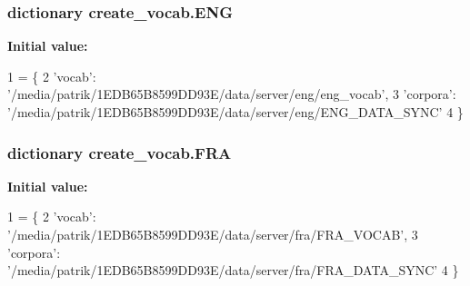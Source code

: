 \subsubsection[{\texorpdfstring{E\+NG}{ENG}}]{\setlength{\rightskip}{0pt plus 5cm}dictionary create\+\_\+vocab.\+E\+NG}\hypertarget{namespacecreate__vocab_afbb5dbfe263e7c25716667d192f7205c}{}\label{namespacecreate__vocab_afbb5dbfe263e7c25716667d192f7205c}
{\bfseries Initial value\+:}
\begin{DoxyCode}
1 = \{
2     \textcolor{stringliteral}{'vocab'}:    \textcolor{stringliteral}{'/media/patrik/1EDB65B8599DD93E/data/server/eng/eng\_vocab'},
3     \textcolor{stringliteral}{'corpora'}:  \textcolor{stringliteral}{'/media/patrik/1EDB65B8599DD93E/data/server/eng/ENG\_DATA\_SYNC'}
4 \}
\end{DoxyCode}
\subsubsection[{\texorpdfstring{F\+RA}{FRA}}]{\setlength{\rightskip}{0pt plus 5cm}dictionary create\+\_\+vocab.\+F\+RA}\hypertarget{namespacecreate__vocab_ac65cf5bdb78c95c3444403ba8b939fb0}{}\label{namespacecreate__vocab_ac65cf5bdb78c95c3444403ba8b939fb0}
{\bfseries Initial value\+:}
\begin{DoxyCode}
1 = \{
2     \textcolor{stringliteral}{'vocab'}:    \textcolor{stringliteral}{'/media/patrik/1EDB65B8599DD93E/data/server/fra/FRA\_VOCAB'},
3     \textcolor{stringliteral}{'corpora'}:  \textcolor{stringliteral}{'/media/patrik/1EDB65B8599DD93E/data/server/fra/FRA\_DATA\_SYNC'}
4 \}
\end{DoxyCode}
